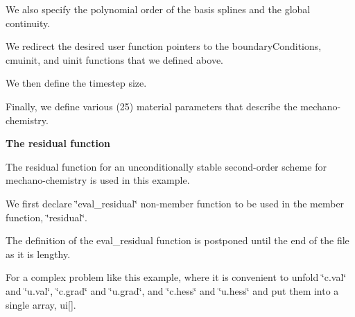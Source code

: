 \begin{DoxyCodeInclude}

\end{DoxyCodeInclude}


We also specify the polynomial order of the basis splines and the global continuity.


\begin{DoxyCodeInclude}

\end{DoxyCodeInclude}


We redirect the desired user function pointers to the {\ttfamily boundary\-Conditions}, {\ttfamily cmuinit}, and {\ttfamily uinit} functions that we defined above.


\begin{DoxyCodeInclude}

\end{DoxyCodeInclude}


We then define the timestep size.


\begin{DoxyCodeInclude}

\end{DoxyCodeInclude}


Finally, we define various (25) material parameters that describe the mechano-\/chemistry.


\begin{DoxyCodeInclude}

\end{DoxyCodeInclude}


{\bfseries  The {\ttfamily residual} function }

The residual function for an unconditionally stable second-\/order scheme for mechano-\/chemistry is used in this example.

We first declare {\ttfamily \char`\"{}eval\-\_\-residual\char`\"{}} non-\/member function to be used in the member function, {\ttfamily \char`\"{}residual\char`\"{}}.


\begin{DoxyCodeInclude}

\end{DoxyCodeInclude}


The definition of the {\ttfamily eval\-\_\-residual} function is postponed until the end of the file as it is lengthy.

For a complex problem like this example, where it is convenient to unfold \char`\"{}c.\-val\char`\"{} and \char`\"{}u.\-val\char`\"{}, \char`\"{}c.\-grad\char`\"{} and \char`\"{}u.\-grad\char`\"{}, and \char`\"{}c.\-hess\char`\"{} and \char`\"{}u.\-hess\char`\"{} and put them into a single array, ui\mbox{[}\mbox{]}.


